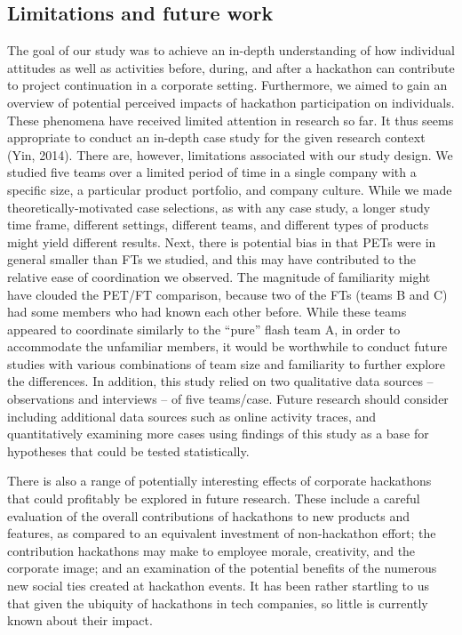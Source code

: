 \documentclass{hcij}
\begin{document}
\subsection{Limitations and future work}
The goal of our study was to achieve an in-depth understanding of how individual attitudes as well as activities before, during, and after a hackathon can contribute to project continuation in a corporate setting. Furthermore, we aimed to gain an overview of potential perceived impacts of hackathon participation on individuals. These phenomena have received limited attention in research so far. It thus seems appropriate to conduct an in-depth case study for the given research context (Yin, 2014). There are, however, limitations associated with our study design. We studied five teams over a limited period of time in a single company with a specific size, a particular product portfolio, and company culture. While we made theoretically-motivated case selections, as with any case study, a longer study time frame, different settings, different teams, and different types of products might yield different results. Next, there is potential bias in that PETs were in general smaller than FTs we studied, and this may have contributed to the relative ease of coordination we observed. The magnitude of familiarity might have clouded the PET/FT comparison, because two of the FTs (teams B and C) had some members who had known each other before. While these teams appeared to coordinate similarly to the “pure” flash team A, in order to accommodate the unfamiliar members, it would be worthwhile to conduct future studies with various combinations of team size and familiarity to further explore the differences. In addition, this study relied on two qualitative data sources –observations and interviews – of five teams/case. Future research should consider including additional data sources such as online activity traces, and quantitatively examining more cases using findings of this study as a base for hypotheses that could be tested statistically.

There is also a range of potentially interesting effects of corporate hackathons that could profitably be explored in future research. These include a careful evaluation of the overall contributions of hackathons to new products and features, as compared to an equivalent investment of non-hackathon effort; the contribution hackathons may make to employee morale, creativity, and the corporate image; and an examination of the potential benefits of the numerous new social ties created at hackathon events. It has been rather startling to us that given the ubiquity of hackathons in tech companies, so little is currently known about their impact.
\end{document}
